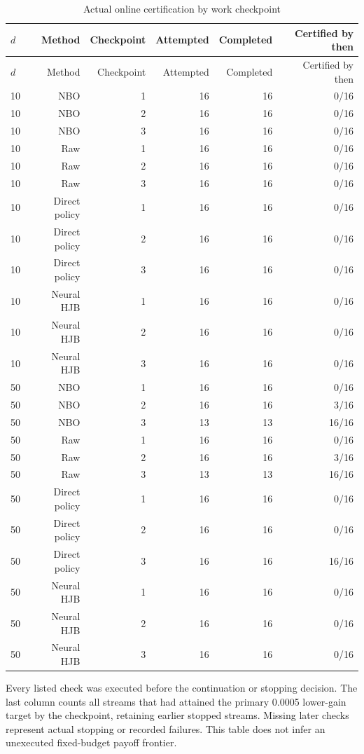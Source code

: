 \begingroup\small
\begin{longtable}{lrrrrr}
\caption{Actual online certification by work checkpoint}\label{tab:r15methodcheckpoints}\\
\toprule
$d$ & Method & Checkpoint & Attempted & Completed & Certified by then \\
\midrule
\endfirsthead
\toprule
$d$ & Method & Checkpoint & Attempted & Completed & Certified by then \\
\midrule
\endhead
10 & NBO & 1 & 16 & 16 & 0/16 \\
10 & NBO & 2 & 16 & 16 & 0/16 \\
10 & NBO & 3 & 16 & 16 & 0/16 \\
10 & Raw & 1 & 16 & 16 & 0/16 \\
10 & Raw & 2 & 16 & 16 & 0/16 \\
10 & Raw & 3 & 16 & 16 & 0/16 \\
10 & Direct policy & 1 & 16 & 16 & 0/16 \\
10 & Direct policy & 2 & 16 & 16 & 0/16 \\
10 & Direct policy & 3 & 16 & 16 & 0/16 \\
10 & Neural HJB & 1 & 16 & 16 & 0/16 \\
10 & Neural HJB & 2 & 16 & 16 & 0/16 \\
10 & Neural HJB & 3 & 16 & 16 & 0/16 \\
50 & NBO & 1 & 16 & 16 & 0/16 \\
50 & NBO & 2 & 16 & 16 & 3/16 \\
50 & NBO & 3 & 13 & 13 & 16/16 \\
50 & Raw & 1 & 16 & 16 & 0/16 \\
50 & Raw & 2 & 16 & 16 & 3/16 \\
50 & Raw & 3 & 13 & 13 & 16/16 \\
50 & Direct policy & 1 & 16 & 16 & 0/16 \\
50 & Direct policy & 2 & 16 & 16 & 0/16 \\
50 & Direct policy & 3 & 16 & 16 & 16/16 \\
50 & Neural HJB & 1 & 16 & 16 & 0/16 \\
50 & Neural HJB & 2 & 16 & 16 & 0/16 \\
50 & Neural HJB & 3 & 16 & 16 & 0/16 \\
\bottomrule
\end{longtable}
\par\medskip\noindent\footnotesize Every listed check was executed before the continuation or stopping decision. The last column counts all streams that had attained the primary 0.0005 lower-gain target by the checkpoint, retaining earlier stopped streams. Missing later checks represent actual stopping or recorded failures. This table does not infer an unexecuted fixed-budget payoff frontier.
\endgroup
